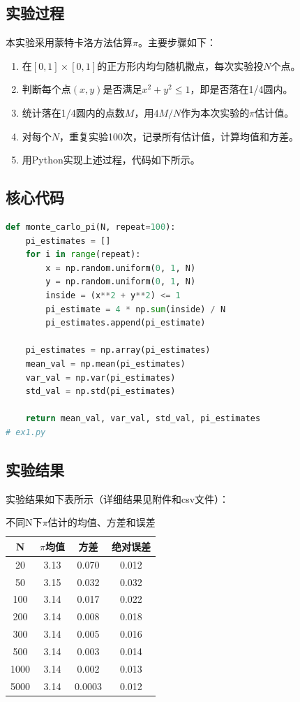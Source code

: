 \documentclass[a4paper]{article}
\begin{document}
\subsection{实验过程}
本实验采用蒙特卡洛方法估算$\pi$。主要步骤如下：
\begin{enumerate}
    \item 在$[0,1]\times[0,1]$的正方形内均匀随机撒点，每次实验投$N$个点。
    \item 判断每个点$(x, y)$是否满足$x^2 + y^2 \leq 1$，即是否落在1/4圆内。
    \item 统计落在1/4圆内的点数$M$，用$4M/N$作为本次实验的$\pi$估计值。
    \item 对每个$N$，重复实验100次，记录所有估计值，计算均值和方差。
    \item 用Python实现上述过程，代码如下所示。
\end{enumerate}

\subsection{核心代码}
\begin{lstlisting}[language=Python, caption=蒙特卡洛估算$\pi$的Python代码]
def monte_carlo_pi(N, repeat=100):
    pi_estimates = []
    for i in range(repeat):
        x = np.random.uniform(0, 1, N)
        y = np.random.uniform(0, 1, N)
        inside = (x**2 + y**2) <= 1
        pi_estimate = 4 * np.sum(inside) / N
        pi_estimates.append(pi_estimate)
    
    pi_estimates = np.array(pi_estimates)
    mean_val = np.mean(pi_estimates)
    var_val = np.var(pi_estimates)
    std_val = np.std(pi_estimates)
    
    return mean_val, var_val, std_val, pi_estimates
# ex1.py
\end{lstlisting}

\subsection{实验结果}
实验结果如下表所示（详细结果见附件和csv文件）：

\begin{table}[H]
    \centering
    \caption{不同N下$\pi$估计的均值、方差和误差}
    \begin{tabular}{cccc}
        \toprule
        N & $\pi$均值 & 方差 & 绝对误差 \\
        \midrule
        20   & 3.13 & 0.070 & 0.012 \\
        50   & 3.15 & 0.032 & 0.032 \\
        100  & 3.14 & 0.017 & 0.022 \\
        200  & 3.14 & 0.008 & 0.018 \\
        300  & 3.14 & 0.005 & 0.016 \\
        500  & 3.14 & 0.003 & 0.014 \\
        1000 & 3.14 & 0.002 & 0.013 \\
        5000 & 3.14 & 0.0003 & 0.012 \\
        \bottomrule
    \end{tabular}
\end{table}
\end{document}
